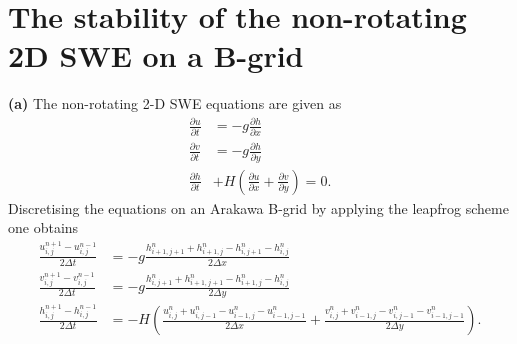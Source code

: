 \section{The stability of the non-rotating 2D SWE  on a B-grid}

\textbf{(a)} The non-rotating 2-D SWE equations are given as 
\begin{subequations}
\begin{align}
\frac{\partial u}{\partial t}& = -g \frac{\partial h}{\partial x} \\
\frac{\partial v}{\partial t}& = -g \frac{\partial h}{\partial y} \\
\frac{\partial h}{\partial t}& + H \left( \frac{\partial u}{\partial x} + \frac{\partial v}{\partial y} \right) = 0.
\end{align}
\label{eq:SWE}
\end{subequations}
Discretising the equations on an Arakawa B-grid by applying the leapfrog scheme one obtains
\begin{subequations}
\begin{align}
\frac{u_{i,j}^{n+1} - u_{i,j}^{n-1}}{2\Delta t} &= -g \frac{h_{i+1,j+1}^{n} + h_{i+1,j}^{n}-h_{i,j+1}^{n}-h_{i,j}^{n}}{2\Delta x} \\
\frac{v_{i,j}^{n+1} - v_{i,j}^{n-1}}{2\Delta t} &= -g \frac{h_{i,j+1}^{n} + h_{i+1,j+1}^{n}-h_{i+1,j}^{n}-h_{i,j}^{n}}{2\Delta y}
\\
\frac{h_{i,j}^{n+1} - h_{i,j}^{n-1}}{2\Delta t}& = - H \left( \frac{u_{i,j}^{n} + u_{i,j-1}^{n}-u_{i-1,j}^{n}-u_{i-1,j-1}^{n}}{2\Delta x} + \frac{v_{i,j}^{n} + v_{i-1,j}^{n}-v_{i,j-1}^{n}-v_{i-1,j-1}^{n}}{2\Delta y} \right).
\end{align}
\label{eq:discretised_SWE}
\end{subequations}

